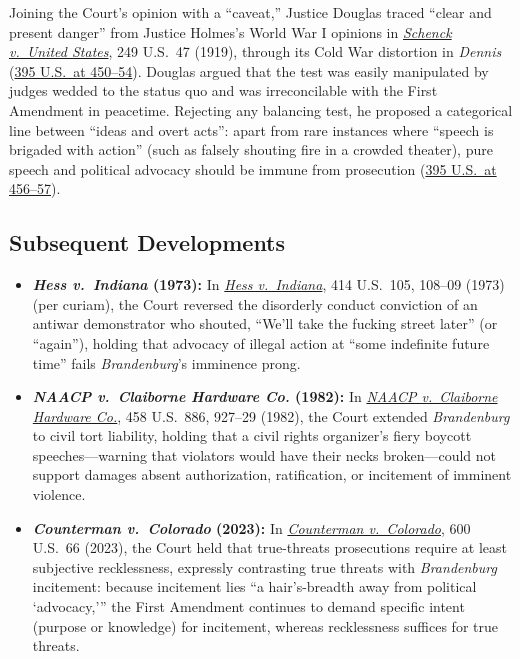 \documentclass[12pt]{article}
\begin{document}
Joining the Court's opinion with a ``caveat,'' Justice Douglas traced ``clear and present danger'' from Justice Holmes's World War I opinions in \href{https://supreme.justia.com/cases/federal/us/249/47/}{\emph{Schenck v.\ United States}}, 249 U.S.\ 47 (1919), through its Cold War distortion in \emph{Dennis} (\href{https://supreme.justia.com/cases/federal/us/395/444/}{395 U.S.\ at 450--54}). Douglas argued that the test was easily manipulated by judges wedded to the status quo and was irreconcilable with the First Amendment in peacetime. Rejecting any balancing test, he proposed a categorical line between ``ideas and overt acts'': apart from rare instances where ``speech is brigaded with action'' (such as falsely shouting fire in a crowded theater), pure speech and political advocacy should be immune from prosecution (\href{https://supreme.justia.com/cases/federal/us/395/444/}{395 U.S.\ at 456--57}).

\subsection{Subsequent Developments}

\begin{itemize}

\item \textbf{\textit{Hess v.\ Indiana} (1973):} In \href{https://supreme.justia.com/cases/federal/us/414/105/}{\emph{Hess v.\ Indiana}}, 414 U.S.\ 105, 108--09 (1973) (per curiam), the Court reversed the disorderly conduct conviction of an antiwar demonstrator who shouted, ``We'll take the fucking street later'' (or ``again''), holding that advocacy of illegal action at ``some indefinite future time'' fails \emph{Brandenburg}'s imminence prong.

\item \textbf{\textit{NAACP v.\ Claiborne Hardware Co.} (1982):} In \href{https://supreme.justia.com/cases/federal/us/458/886/}{\emph{NAACP v.\ Claiborne Hardware Co.}}, 458 U.S.\ 886, 927--29 (1982), the Court extended \emph{Brandenburg} to civil tort liability, holding that a civil rights organizer's fiery boycott speeches---warning that violators would have their necks broken---could not support damages absent authorization, ratification, or incitement of imminent violence.

\item \textbf{\textit{Counterman v.\ Colorado} (2023):} In \href{https://www.law.cornell.edu/supremecourt/text/22-138}{\emph{Counterman v.\ Colorado}}, 600 U.S.\ 66 (2023), the Court held that true-threats prosecutions require at least subjective recklessness, expressly contrasting true threats with \emph{Brandenburg} incitement: because incitement lies ``a hair's-breadth away from political `advocacy,''' the First Amendment continues to demand specific intent (purpose or knowledge) for incitement, whereas recklessness suffices for true threats.

\end{itemize}
\end{document}
